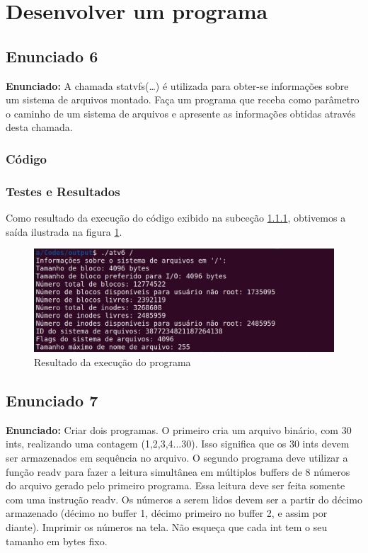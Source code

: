 \documentclass{article}
\begin{document}
\section{Desenvolver um programa}

\subsection{Enunciado 6}

\textbf{Enunciado:}  A chamada statvfs(…) é utilizada para obter-se informações sobre um sistema de arquivos montado. Faça um programa que receba como parâmetro o caminho de um sistema de arquivos e apresente as informações obtidas através desta chamada.\newline

\subsubsection{Código}
\label{sub-sec-cod1}


\subsubsection{Testes e Resultados}
Como resultado da execução do código exibido na subceção \ref{sub-sec-cod1}, obtivemos a saída ilustrada na figura \ref{fig:exec1}. 

\begin{figure}[ht]
    \centering
    \includegraphics[width=1\textwidth]{./Images/res6.png}
    \caption{Resultado da execução do programa}
    \label{fig:exec1}
\end{figure}

\subsection{Enunciado 7}

\textbf{Enunciado:}   Criar dois programas. O primeiro cria um arquivo binário, com 30 ints, realizando uma contagem (1,2,3,4...30). Isso significa que os 30 ints devem ser armazenados em sequência no arquivo. O segundo programa deve utilizar a função readv para fazer a leitura simultânea em múltiplos buffers de 8 números do arquivo gerado pelo primeiro programa. Essa leitura deve ser feita somente com uma instrução readv. Os números a serem lidos devem ser a partir do décimo armazenado (décimo no buffer 1, décimo primeiro no buffer 2, e assim por diante). Imprimir os números na tela. Não esqueça que cada int tem o seu tamanho em bytes fixo.\newline
\end{document}
